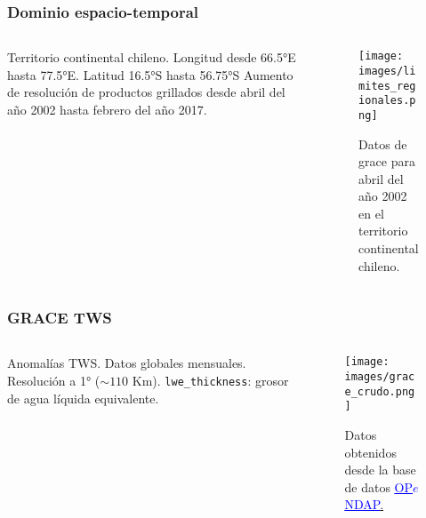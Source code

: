 \documentclass{beamer}
\begin{document}
  \begin{frame}
    \frametitle{Dominio espacio-temporal}

    \begin{columns}

      \begin{column}{0.5\textwidth}
        \begin{outline}
          \1 Territorio continental chileno.
            \2 Longitud desde 66.5°E hasta 77.5°E.
            \2 Latitud 16.5°S hasta 56.75°S
          \1 Aumento de resolución de productos grillados desde abril del año 2002 hasta febrero del año 2017.
        \end{outline}
      \end{column}

      \begin{column}{0.5\textwidth}
        \begin{figure}
          \centering
          \texttt{[image: images/limites\_regionales.png]}
          \caption{Datos de grace para abril del año 2002 en el territorio continental chileno.}
        \end{figure}
      \end{column}

    \end{columns}

  \end{frame}

  \begin{frame}
    \frametitle{GRACE TWS}
    \begin{columns}

      \begin{column}{0.5\textwidth}
        \begin{outline}
          \1 Anomalías TWS.
          \1 Datos globales mensuales.
          \1 Resolución a 1° ($\sim 110$ Km).
          \1 \texttt{lwe\_thickness}: grosor de agua líquida equivalente.
        \end{outline}
      \end{column}

      \begin{column}{0.5\textwidth}
        \begin{figure}
          \centering
          \texttt{[image: images/grace\_crudo.png]}
          \caption{Datos obtenidos desde la base de datos 
            \href{https://podaac-opendap.jpl.nasa.gov/opendap/allData/tellus/L3/grace/land_mass/RL06/v04/CSR/}
            {\textcolor{blue}{\underline{OP$e$NDAP}}.}}
        \end{figure}
      \end{column}

    \end{columns}
  \end{frame}
\end{document}
